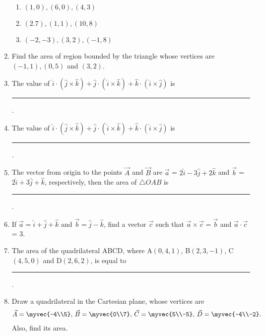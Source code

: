 \begin{enumerate}[label=\thesubsection.\arabic*,ref=\thesubsection.\theenumi]
\begin{enumerate}
\item $(1,0), (6,0), (4,3)$
\item $(2.7), (1,1), (10,8)$
\item $(-2,-3), (3,2), (-1,8)$
\end{enumerate}
\item Find the area of region bounded by the triangle whose vertices are $(-1, 1), (0, 5)$ and $(3, 2)$.
\item The value of $\hat{i}\cdot(\hat{j}\times\hat{k})+\hat{j}\cdot(\hat{i}\times\hat{k})+\hat{k}\cdot(\hat{i}\times\hat{j})$ is \rule{1cm}{0.1pt}.
\item The value of $\hat{i}\cdot (\hat{j}\times\hat{k})+\hat{j}\cdot (\hat{i}\times\hat{k})+\hat{k}\cdot (\hat{i}\times\hat{j})$ is \rule{1cm}{0.1pt}.

\item The vector from origin to the points $\vec{A}$ and $\vec{B}$ are $\vec{a}$ = $2\hat{i}-3\hat{j}+2\hat{k}$ and  $\vec{b}$ = $2\hat{i}+3\hat{j}+\hat{k}$, respectively, then the area of $\triangle {OAB}$ is \rule{1cm}{0.1pt}.
\item If $\vec{a} = \hat{i}+\hat{j}+\hat{k}$ and $\vec{b} = \hat{j}-\hat{k}$, find a vector $\vec{c}$ such that $\vec{a}\times\vec{c} = \vec{b}$ and $\vec{a}\cdot \vec{c}$ = 3.
%
\item The area of the quadrilateral ABCD, where A$(0,4,1)$, B$(2,3,-1)$, C$(4,5,0)$ and D$(2,6,2)$, is equal to \rule{1cm}{0.1pt}.
    \item Draw a quadrilateral in the Cartesian plane, whose vertices are 
    \begin{align}
        \vec{A} = \myvec{-4\\5},\, \vec{B} = \myvec{0\\7},\, 
        \vec{C} = \myvec{5\\-5},\, \vec{D} = \myvec{-4\\-2}.
    \end{align}
    Also, find its area.
\label{chapters/11/10/1/1}
   \\ 
    \solution 

\end{enumerate}

